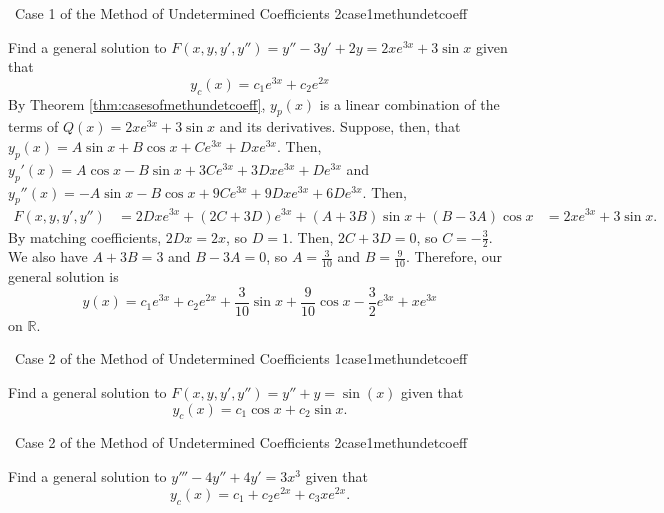     \begin{example}{\Difficulty\,\Difficulty\,\,Case 1 of the Method of Undetermined Coefficients 2}{case1methundetcoeff}
        
        Find a general solution to \(F(x,y,y',y'')=y''-3y'+2y=2xe^{3x}+3\sin x\) given that
        \begin{equation*}
            y_c(x)=c_1e^{3x}+c_2e^{2x}
        \end{equation*}
        By Theorem \ref{thm:casesofmethundetcoeff}, \(y_p(x)\) is a linear combination of the terms of \(Q(x)=2xe^{3x}+3\sin x\) and its derivatives. Suppose, then, that \(y_p(x)=A\sin x+B\cos x+Ce^{3x}+Dxe^{3x}\). Then, \(y_p'(x)=A\cos x-B\sin x+3Ce^{3x}+3Dxe^{3x}+De^{3x}\) and \(y_p''(x)=-A\sin x-B\cos x+9Ce^{3x}+9Dxe^{3x}+6De^{3x}\). Then,
        \begin{align*}
            F(x,y,y',y'')&=2Dxe^{3x}+(2C+3D)e^{3x}+(A+3B)\sin x+(B-3A)\cos x &= 2xe^{3x}+3\sin x.
        \end{align*}
        By matching coefficients, \(2Dx=2x\), so \(D=1\). Then, \(2C+3D=0\), so \(C=-\frac{3}{2}\). We also have \(A+3B=3\) and \(B-3A=0\), so \(A=\frac{3}{10}\) and \(B=\frac{9}{10}\). Therefore, our general solution is
        \begin{equation*}
            y(x)=c_1e^{3x}+c_2e^{2x}+\frac{3}{10}\sin x+\frac{9}{10}\cos x-\frac{3}{2}e^{3x}+xe^{3x}
        \end{equation*}
        on \(\mathbb{R}\).

    \end{example}
    \begin{example}{\Difficulty\,\Difficulty\,\,Case 2 of the Method of Undetermined Coefficients 1}{case1methundetcoeff}
        
        Find a general solution to \(F(x,y,y',y'')=y''+y=\sin(x)\) given that
        \begin{equation*}
            y_c(x)=c_1\cos x+c_2\sin x.
        \end{equation*}

    \end{example}
    \begin{example}{\Difficulty\,\Difficulty\,\,Case 2 of the Method of Undetermined Coefficients 2}{case1methundetcoeff}

        Find a general solution to \(y'''-4y''+4y'=3x^3\) given that
        \begin{equation*}
            y_c(x)=c_1+c_2e^{2x}+c_3xe^{2x}.
        \end{equation*}
        
    \end{example}

